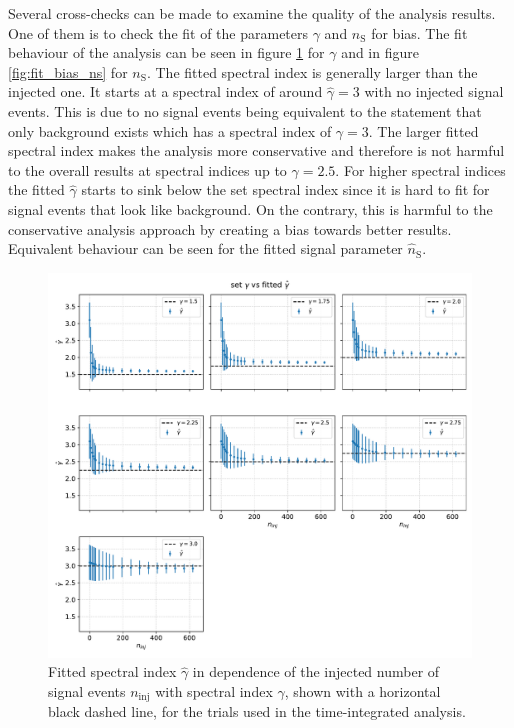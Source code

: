 Several cross-checks can be made to examine the quality of the analysis results.
One of them is to check the fit of the parameters $\gamma$ and $n_\text{S}$ for bias.
The fit behaviour of the analysis can be seen in figure \ref{fig:fit_bias_gamma} for $\gamma$ and in figure \ref{fig:fit_bias_ns} for $n_\text{S}$.
The fitted spectral index is generally larger than the injected one.
It starts at a spectral index of around $\hat\gamma = \num{3}$ with no injected signal events.
This is due to no signal events being equivalent to the statement that only background exists which has a spectral index of $\gamma = \num{3}$.
The larger fitted spectral index makes the analysis more conservative and therefore is not harmful to the overall results at spectral indices up to $\gamma = \num{2.5}$.
For higher spectral indices the fitted $\hat\gamma$ starts to sink below the set spectral index since it is hard to fit for signal events that look like background.
On the contrary, this is harmful to the conservative analysis approach by creating a bias towards better results.
Equivalent behaviour can be seen for the fitted signal parameter $\hat{n}_\text{S}$.
\begin{figure}
    \centering
    \includegraphics[width=\linewidth]{Plots/05_csky/gamma_fit_auto_3.pdf}
    \caption{Fitted spectral index $\hat\gamma$ in dependence of the injected number of signal events $n_\text{inj}$ with spectral index $\gamma$, shown with a horizontal black dashed line, for the trials used in the time-integrated analysis.}
    \label{fig:fit_bias_gamma}
\end{figure}

